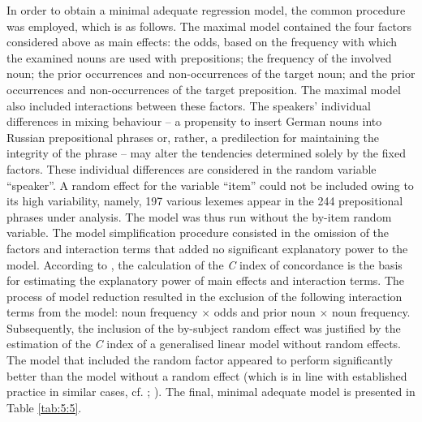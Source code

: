 In order to obtain a minimal adequate regression model, the common procedure \citep{baayen-2013,szmrecsanyi-2013} was employed, which is as follows. The maximal model contained the four factors considered above as main effects: the odds, based on the frequency with which the examined nouns are used with prepositions; the frequency of the involved noun; the prior occurrences and non-occurrences of the target noun; and the prior occurrences and non-occurrences of the target preposition. The maximal model also included interactions between these factors. The speakers' individual differences in mixing behaviour -- a propensity to insert German nouns into Russian prepositional phrases or, rather, a predilection for maintaining the integrity of the phrase  --  may alter the tendencies determined solely by the fixed factors. These individual differences are considered in the random variable “speaker”. A random effect for the variable “item” could not be included owing to its high variability, namely, 197 various lexemes appear in the 244 prepositional phrases under analysis. The model was thus run without the by-item random variable. The model simplification procedure consisted in the omission of the factors and interaction terms that added no significant explanatory power to the model. According to \citet[281]{baayen-analyzing}, the calculation of the \textit{C} index of concordance is the basis for estimating the explanatory power of main effects and interaction terms. The process of model reduction resulted in the exclusion of the following interaction terms from the model: noun frequency $\times$ odds and prior noun $\times$ noun frequency. Subsequently, the inclusion of the by-subject random effect was justified by the estimation of the \textit{C} index of a generalised linear model without random effects. The model that included the random factor appeared to perform significantly better than the model without a random effect (which is in line with established practice in similar cases, cf. \citealt{bresnan-etal}; \citealt{tagliamonte-baayen-2012}). The final, minimal adequate model is presented in Table \ref{tab:5:5}.

